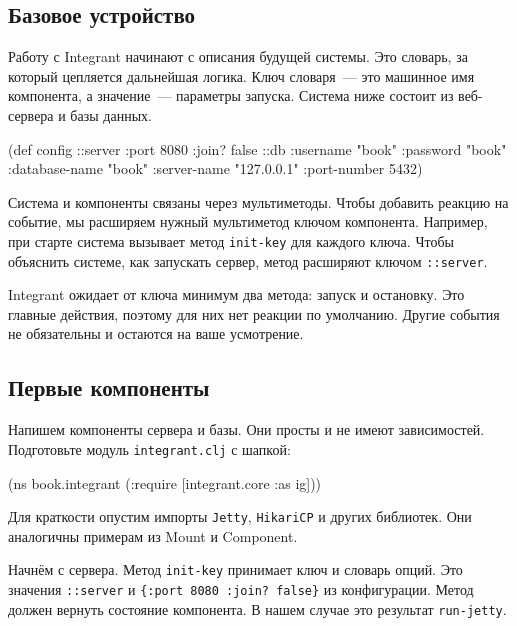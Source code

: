 \subsection{Базовое устройство}

Работу с Integrant начинают с описания будущей системы. Это словарь, за который
цепляется дальнейшая логика. Ключ словаря~--- это машинное имя компонента, а
значение~--- параметры запуска. Система ниже состоит из веб-сервера и базы
данных.

\begin{english}
  \begin{clojure}
(def config
  {::server {:port 8080 :join? false}
   ::db {:username      "book"
         :password      "book"
         :database-name "book"
         :server-name   "127.0.0.1"
         :port-number   5432}})
  \end{clojure}
\end{english}


Система и компоненты связаны через мультиметоды. Чтобы добавить реакцию на
событие, мы расширяем нужный мультиметод ключом компонента. Например, при старте
система вызывает метод \verb|init-key| для каждого ключа. Чтобы объяснить
системе, как запускать сервер, метод расширяют ключом \verb|::server|.

Integrant ожидает от ключа минимум два метода: запуск и остановку. Это главные
действия, поэтому для них нет реакции по умолчанию. Другие события не
обязательны и остаются на ваше усмотрение.

\subsection{Первые компоненты}


Напишем компоненты сервера и базы. Они просты и не имеют
зависимостей. Подготовьте модуль \verb|integrant.clj| с шапкой:

\begin{english}
  \begin{clojure}
(ns book.integrant
  (:require [integrant.core :as ig]))
  \end{clojure}
\end{english}

Для краткости опустим импорты \verb|Jetty|, \verb|HikariCP| и других
библиотек. Они аналогичны примерам из Mount и Component.

Начнём с сервера. Метод \verb|init-key| принимает ключ и словарь опций. Это
значения \verb|::server| и \verb|{:port 8080 :join? false}| из
конфигурации. Метод должен вернуть состояние компонента. В нашем случае это
результат \verb|run-jetty|.

